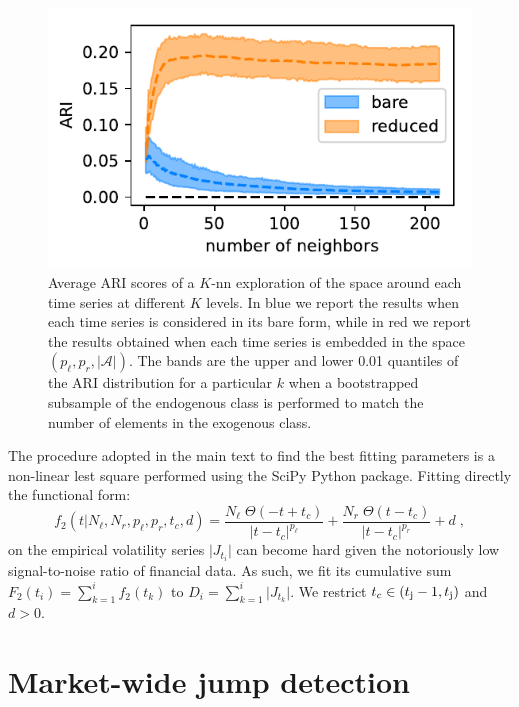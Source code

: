 \documentclass[amsmath,amssymb,aps,pre,floatfix,twocolumn,superscriptaddress]{revtex4}
\begin{document}
\begin{figure}[t]
  \centering
  \includegraphics[width=0.45\linewidth]{appendix_plots/knn_sornette_fit.pdf} 
  \caption{Average ARI scores of a $K$-nn exploration of the space around each time series at different $K$ levels. In blue we report the results when each time series is considered in its bare form, while in red we report the results obtained when each time series is embedded in the space $(p_\ell,p_r,\vert \mathcal{A}\vert)$. The bands are the upper and lower 0.01 quantiles of the ARI distribution for a particular $k$ when a bootstrapped subsample of the endogenous class is performed to match the number of elements in the exogenous class.}
  \label{fig: knn appendix}
\end{figure}

The procedure adopted in the main text to find the best fitting parameters is a non-linear lest square performed using the SciPy Python package. Fitting directly the functional form:
\begin{equation*}
f_2(t \vert N_{\ell},N_r,p_{\ell},p_r,t_c,d ) = \frac{N_{\ell} \; \Theta(-t+t_c)}{\vert t-t_c \vert^{p_{\ell}}} + \frac{N_r \; \Theta(t-t_c)}{\vert t-t_c \vert^{p_r}} + d \; ,
\end{equation*}
on the empirical volatility series $\vert J_{t_i}\vert$ can become hard given the notoriously low signal-to-noise ratio of financial data. As such, we fit its cumulative sum $F_2(t_i) = \sum_{k=1}^i f_2(t_k)$ to $D_i = \sum_{k=1}^i \vert J_{t_k}\vert$. We restrict $t_c \in (t_{\text j}-1, t_{\text j})$ and $d>0$.

\section{Market-wide jump detection}
\end{document}
